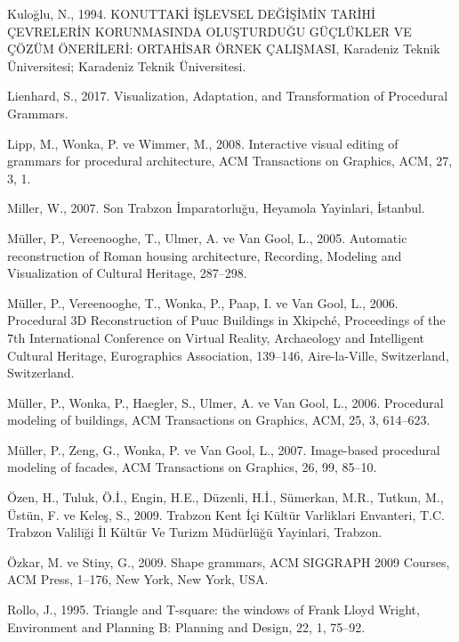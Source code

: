 \documentclass[12pt,turkish,a4paperpaper,]{report}
\begin{document}
\leavevmode\hypertarget{ref-Kuloglu:1994uy}{}%
Kuloğlu, N., 1994. KONUTTAKİ İŞLEVSEL DEĞİŞİMİN TARİHİ ÇEVRELERİN
KORUNMASINDA OLUŞTURDUĞU GÜÇLÜKLER VE ÇÖZÜM ÖNERİLERİ: ORTAHİSAR ÖRNEK
ÇALIŞMASI, Karadeniz Teknik Üniversitesi; Karadeniz Teknik Üniversitesi.

\leavevmode\hypertarget{ref-Lienhard:2017jv}{}%
Lienhard, S., 2017. Visualization, Adaptation, and Transformation of
Procedural Grammars.

\leavevmode\hypertarget{ref-Lipp:2008hv}{}%
Lipp, M., Wonka, P. ve Wimmer, M., 2008. Interactive visual editing of
grammars for procedural architecture, ACM Transactions on Graphics, ACM,
27, 3, 1.

\leavevmode\hypertarget{ref-Miller:2007uq}{}%
Miller, W., 2007. Son Trabzon İmparatorluğu, Heyamola Yayinlari,
İstanbul.

\leavevmode\hypertarget{ref-Muller:2005uf}{}%
Müller, P., Vereenooghe, T., Ulmer, A. ve Van Gool, L., 2005. Automatic
reconstruction of Roman housing architecture, Recording, Modeling and
Visualization of Cultural Heritage, 287--298.

\leavevmode\hypertarget{ref-Muller:2006hz}{}%
Müller, P., Vereenooghe, T., Wonka, P., Paap, I. ve Van Gool, L., 2006.
Procedural 3D Reconstruction of Puuc Buildings in Xkipché, Proceedings
of the 7th International Conference on Virtual Reality, Archaeology and
Intelligent Cultural Heritage, Eurographics Association, 139--146,
Aire-la-Ville, Switzerland, Switzerland.

\leavevmode\hypertarget{ref-Muller:2006fy}{}%
Müller, P., Wonka, P., Haegler, S., Ulmer, A. ve Van Gool, L., 2006.
Procedural modeling of buildings, ACM Transactions on Graphics, ACM, 25,
3, 614--623.

\leavevmode\hypertarget{ref-Muller:2007gu}{}%
Müller, P., Zeng, G., Wonka, P. ve Van Gool, L., 2007. Image-based
procedural modeling of facades, ACM Transactions on Graphics, 26, 99,
85--10.

\leavevmode\hypertarget{ref-Ozen:2009wo}{}%
Özen, H., Tuluk, Ö.İ., Engin, H.E., Düzenli, H.İ., Sümerkan, M.R.,
Tutkun, M., Üstün, F. ve Keleş, S., 2009. Trabzon Kent İçi Kültür
Varliklari Envanteri, T.C. Trabzon Valiliği İl Kültür Ve Turizm
Müdürlüğü Yayinlari, Trabzon.

\leavevmode\hypertarget{ref-Ozkar:2009ga}{}%
Özkar, M. ve Stiny, G., 2009. Shape grammars, ACM SIGGRAPH 2009 Courses,
ACM Press, 1--176, New York, New York, USA.

\leavevmode\hypertarget{ref-Rollo:1995bz}{}%
Rollo, J., 1995. Triangle and T-square: the windows of Frank Lloyd
Wright, Environment and Planning B: Planning and Design, 22, 1, 75--92.
\end{document}
